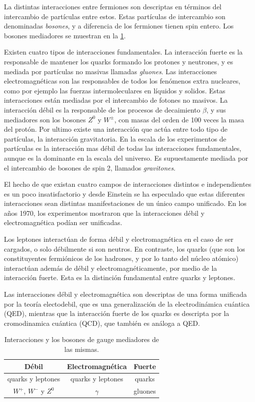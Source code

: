 La distintas interacciones entre fermiones son descriptas en términos del intercambio de partículas
entre estos. Estas partículas de intercambio son denominadas \emph{bosones}, y a diferencia de los
fermiones tienen spin entero. Los bosones mediadores se muestran en la \cref{tab:bosons}.

Existen cuatro tipos de interacciones fundamentales. La interacción fuerte es la responsable
de mantener los quarks formando los protones y neutrones, y es mediada por partículas no masivas
llamadas \emph{gluones}. Las interacciones electromagnéticas son las responsables de todos los
fenómenos extra nucleares, como por ejemplo las fuerzas intermoleculares en líquidos y solidos.
Estas interacciones están mediadas por el intercambio de fotones no masivos.
La interacci\'on débil es la responsable de los procesos de decaimiento $\beta$, y sus mediadores
son los bosones $Z^0$ y $W^\pm$, con masas del orden de 100 veces la masa del protón.
Por ultimo existe una interacción que actúa entre todo tipo de partículas, la interacción gravitatoria.
En la escala de los experimentos de partículas es la interacción mas débil de todas las interacciones
fundamentales, aunque es la dominante en la escala del universo. Es supuestamente mediada por el
intercambio de bosones de spin 2, llamados \emph{gravitones}.

El hecho de que existan cuatro campos de interacciones distintos e independientes es un poco
insatisfactorio y desde Einstein se ha especulado que estas diferentes interacciones sean
distintas manifestaciones de un único campo unificado. En los a\~nos 1970, los experimentos
mostraron que la interacciones débil y electromagnética podían ser unificadas. %

Los leptones interact\'uan de forma d\'ebil y electromagn\'etica en el caso de ser cargados,
o solo d\'ebilmente si son neutros. En contraste, los quarks (que son los constituyentes
fermi\'onicos de los hadrones, y por lo tanto del n\'ucleo at\'omico) interact\'uan adem\'as de
d\'ebil y electromagn\'eticamente, por medio de la interacci\'on fuerte. Esta es la distinci\'on
fundamental entre quarks y leptones.

Las interacciones débil y electromagnética son descriptas de una forma unificada por la
teoría electodebil, que es una generalización de la electrodinámica cuántica (QED), mientras
que la interacción fuerte de los quarks es descripta por la cromodinamica cuántica (QCD), que
también es análoga a QED.

\begin{table}[!ht]
\centering
\begin{tabular}{ccc}
\hline Débil & Electromagnética & Fuerte \\
\hline quarks y leptones & quarks y leptones & quarks \\
\hline $W^+$, $W^-$ y $Z^0$ & $\gamma$ & gluones \\
\hline
\end{tabular}

\caption{Interacciones y los bosones de gauge mediadores de las mismas.}\label{tab:bosons}
\end{table}

